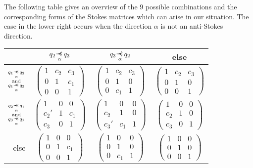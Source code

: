 The following table gives an overview of the $9$ possible combinations and the
corresponding forms of the Stokes matrices which can arise in our situation.
The case in the lower right occurs when the direction $\alpha$ is not an
anti-Stokes direction.
\begin{center}
  \def\arraystretch{1.3}
  \setlength\tabcolsep{4mm}
  \begin{tabular}{r|c|c|c}
    & $q_2\myrel{\alpha}q_3$ & $q_3\myrel{\alpha}q_2$ & else
    \tabularnewline
    \hline
    $\substack{q_1\myrel{\alpha}q_2\\\text{and} \\q_1\myrel{\alpha}q_3}$
    & $\begin{pmatrix} 1 & c_2 & c_3 \\0 & 1 & c_1 \\0 & 0 & 1 \end{pmatrix}$
   \cellcolor{blue!15}
    & $\begin{pmatrix} 1 & c_2 & c_3 \\0 & 1 & 0 \\0 & c_1 & 1 \end{pmatrix}$
   \cellcolor{blue!15}
    & $\begin{pmatrix} 1 & c_2 & c_3 \\0 & 1 & 0 \\0 & 0 & 1 \end{pmatrix}$
   \cellcolor{green!15}
    \tabularnewline
    \hline
    $\substack{q_2\myrel{\alpha}q_1\\\text{and} \\q_3\myrel{\alpha}q_1}$
    & $\begin{pmatrix} 1 & 0 & 0 \\c_2' & 1 & c_1 \\c_3 & 0 & 1 \end{pmatrix}$
   \cellcolor{blue!15}
    & $\begin{pmatrix} 1 & 0 & 0 \\c_2 & 1 & 0 \\c_3' & c_1 & 1 \end{pmatrix}$
   \cellcolor{blue!15}
    & $\begin{pmatrix} 1 & 0 & 0 \\c_2 & 1 & 0 \\c_3 & 0 & 1 \end{pmatrix}$
   \cellcolor{green!15}
    \tabularnewline
    \hline
    else
    & $\begin{pmatrix} 1 & 0 & 0 \\0 & 1 & c_1 \\0 & 0 & 1 \end{pmatrix}$
   \cellcolor{purple!15}
    & $\begin{pmatrix} 1 & 0 & 0 \\0 & 1 & 0 \\0 & c_1 & 1 \end{pmatrix}$
   \cellcolor{purple!15}
    & $\begin{pmatrix} 1 & 0 & 0 \\0 & 1 & 0 \\0 & 0 & 1 \end{pmatrix}$
  \end{tabular}
\end{center}
